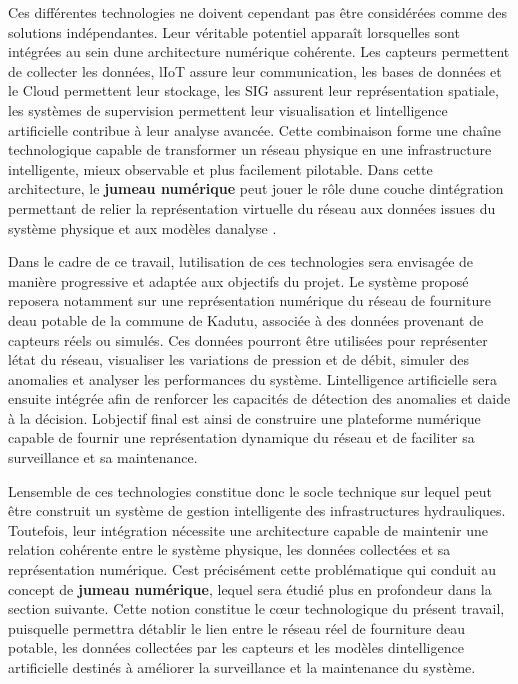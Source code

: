 \documentclass[12pt,a4paper,oneside]{report}
\begin{document}
Ces différentes technologies ne doivent cependant pas être considérées
comme des solutions indépendantes. Leur véritable potentiel apparaît
lorsqu\textquotesingle elles sont intégrées au sein
d\textquotesingle une architecture numérique cohérente. Les capteurs
permettent de collecter les données, l\textquotesingle IoT assure leur
communication, les bases de données et le Cloud permettent leur
stockage, les SIG assurent leur représentation spatiale, les systèmes de
supervision permettent leur visualisation et
l\textquotesingle intelligence artificielle contribue à leur analyse
avancée. Cette combinaison forme une chaîne technologique capable de
transformer un réseau physique en une infrastructure intelligente, mieux
observable et plus facilement pilotable. Dans cette architecture, le
\textbf{jumeau numérique} peut jouer le rôle d\textquotesingle une
couche d\textquotesingle intégration permettant de relier la
représentation virtuelle du réseau aux données issues du système
physique et aux modèles d\textquotesingle analyse \cite{ref56}.

Dans le cadre de ce travail, l\textquotesingle utilisation de ces
technologies sera envisagée de manière progressive et adaptée aux
objectifs du projet. Le système proposé reposera notamment sur une
représentation numérique du réseau de fourniture d\textquotesingle eau
potable de la commune de Kadutu, associée à des données provenant de
capteurs réels ou simulés. Ces données pourront être utilisées pour
représenter l\textquotesingle état du réseau, visualiser les variations
de pression et de débit, simuler des anomalies et analyser les
performances du système. L\textquotesingle intelligence artificielle
sera ensuite intégrée afin de renforcer les capacités de détection des
anomalies et d\textquotesingle aide à la décision.
L\textquotesingle objectif final est ainsi de construire une plateforme
numérique capable de fournir une représentation dynamique du réseau et
de faciliter sa surveillance et sa maintenance.

L\textquotesingle ensemble de ces technologies constitue donc le socle
technique sur lequel peut être construit un système de gestion
intelligente des infrastructures hydrauliques. Toutefois, leur
intégration nécessite une architecture capable de maintenir une relation
cohérente entre le système physique, les données collectées et sa
représentation numérique. C\textquotesingle est précisément cette
problématique qui conduit au concept de \textbf{jumeau numérique},
lequel sera étudié plus en profondeur dans la section suivante. Cette
notion constitue le cœur technologique du présent travail,
puisqu\textquotesingle elle permettra d\textquotesingle établir le lien
entre le réseau réel de fourniture d\textquotesingle eau potable, les
données collectées par les capteurs et les modèles
d\textquotesingle intelligence artificielle destinés à améliorer la
surveillance et la maintenance du système.
\end{document}
